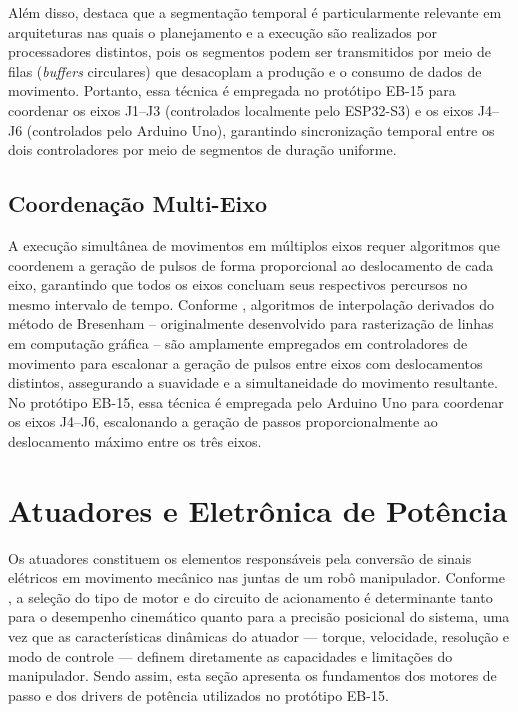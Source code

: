 Além disso,  destaca que a segmentação temporal é particularmente relevante em arquiteturas nas quais o planejamento e a execução são realizados por processadores distintos, pois os segmentos podem ser transmitidos por meio de filas (\textit{buffers} circulares) que desacoplam a produção e o consumo de dados de movimento. Portanto, essa técnica é empregada no protótipo EB-15 para coordenar os eixos J1–J3 (controlados localmente pelo ESP32-S3) e os eixos J4–J6 (controlados pelo Arduino Uno), garantindo sincronização temporal entre os dois controladores por meio de segmentos de duração uniforme.

\subsection{Coordenação Multi-Eixo}

A execução simultânea de movimentos em múltiplos eixos requer algoritmos que coordenem a geração de pulsos de forma proporcional ao deslocamento de cada eixo, garantindo que todos os eixos concluam seus respectivos percursos no mesmo intervalo de tempo. Conforme , algoritmos de interpolação derivados do método de Bresenham -- originalmente desenvolvido para rasterização de linhas em computação gráfica -- são amplamente empregados em controladores de movimento para escalonar a geração de pulsos entre eixos com deslocamentos distintos, assegurando a suavidade e a simultaneidade do movimento resultante. No protótipo EB-15, essa técnica é empregada pelo Arduino Uno para coordenar os eixos J4--J6, escalonando a geração de passos proporcionalmente ao deslocamento máximo entre os três eixos.

\section{Atuadores e Eletrônica de Potência}

Os atuadores constituem os elementos responsáveis pela conversão de sinais elétricos em movimento mecânico nas juntas de um robô manipulador. Conforme , a seleção do tipo de motor e do circuito de acionamento é determinante tanto para o desempenho cinemático quanto para a precisão posicional do sistema, uma vez que as características dinâmicas do atuador — torque, velocidade, resolução e modo de controle — definem diretamente as capacidades e limitações do manipulador. Sendo assim, esta seção apresenta os fundamentos dos motores de passo e dos drivers de potência utilizados no protótipo EB-15.

